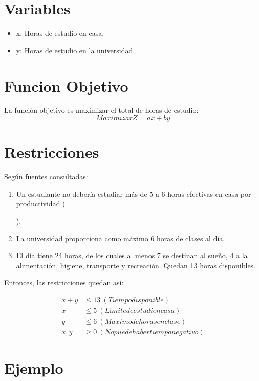 \documentclass[12pt]{article}
\begin{document}
\section*{Variables}

\begin{itemize}
    \item x: Horas de estudio en casa.
    \item y: Horas de estudio en la universidad.
\end{itemize}

\section*{Funcion Objetivo}
La función objetivo es maximizar el total de horas de estudio:
\[
Maximizar Z = ax + by
\]

\section*{Restricciones}
Según fuentes consultadas:
\begin{enumerate}
    \item Un estudiante no debería estudiar más de 5 a 6 horas efectivas en casa por productividad (\author{fuente: Universidad de Harvard - Estrategias de estudio efectivo. Estudiar durante muchas horas sin descanso no es efectivo. Es mejor estudiar en bloques cortos y tomar descansos regulares. Esto mejora la concentración y la retención a largo plazo}).
    \item La universidad proporciona como máximo 6 horas de clases al día.
    \item El día tiene 24 horas, de los cuales al menos 7 se destinan al sueño, 4 a la alimentación, higiene, transporte y recreación. Quedan 13 horas disponibles.
\end{enumerate}
Entonces, las restricciones quedan así:

\[
\begin{aligned}
x + y &\leq 13 \ (Tiempo disponible)\\ 
x &\leq 5 \ (Límite de estudi en casa)\\
y &\leq 6 \ (Maximo de horas en clase) \\
x, y &\geq 0  \ (No puede haber tiempo negativo)
\end{aligned}
\]

\section*{Ejemplo}
\end{document}
